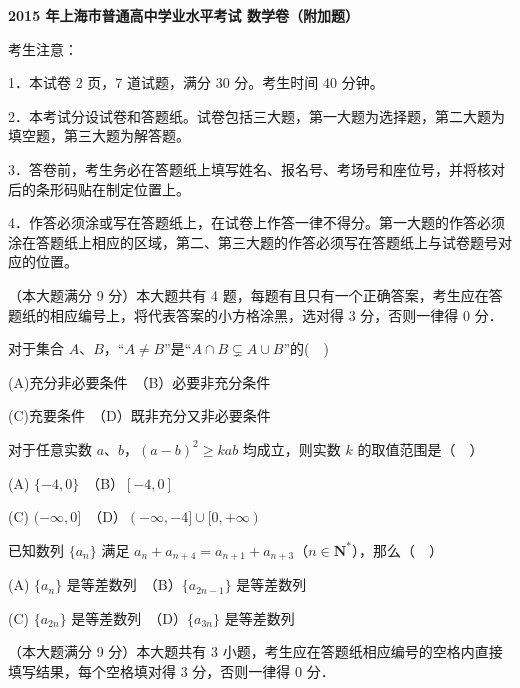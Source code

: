 \textbf{2015 年上海市普通高中学业水平考试 数学卷（附加题）}

考生注意：

1．本试卷 2 页，7 道试题，满分 30 分。考生时间 40 分钟。

2．本考试分设试卷和答题纸。试卷包括三大题，第一大题为选择题，第二大题为填空题，第三大题为解答题。

3．答卷前，考生务必在答题纸上填写姓名、报名号、考场号和座位号，并将核对后的条形码贴在制定位置上。

4．作答必须涂或写在答题纸上，在试卷上作答一律不得分。第一大题的作答必须涂在答题纸上相应的区域，第二、第三大题的作答必须写在答题纸上与试卷题号对应的位置。


（本大题满分 9 分）本大题共有 4 题，每题有且只有一个正确答案，考生应在答题纸的相应编号上，将代表答案的小方格涂黑，选对得 3 分，否则一律得 0 分．

\begin{question}
对于集合 \(A\)、\(B\)，“\(A\neq B\)”是“\(A\cap B\subsetneq A\cup B\)”的(　)

(A)充分非必要条件　（B）必要非充分条件

(C)充要条件　（D）既非充分又非必要条件

\end{question}
\begin{question}
对于任意实数 \(a\)、\(b\)，\((a-b)^{2}\geqslant kab\) 均成立，则实数 \(k\) 的取值范围是（　）

(A) \(\{-4,0\}\)　（B）\([-4,0]\)

(C) \((-\infty,0]\)　（D）\((-\infty,-4]\cup[0,+\infty)\)

\end{question}
\begin{question}
已知数列 \(\{a_{n}\}\) 满足 \(a_{n}+a_{n+4}=a_{n+1}+a_{n+3}\)（\(n\in\mathbf{N}^{*}\)），那么（　）

(A) \(\{a_{n}\}\) 是等差数列　（B）\(\{a_{2n-1}\}\) 是等差数列

(C) \(\{a_{2n}\}\) 是等差数列　（D）\(\{a_{3n}\}\) 是等差数列

\end{question}

（本大题满分 9 分）本大题共有 3 小题，考生应在答题纸相应编号的空格内直接填写结果，每个空格填对得 3 分，否则一律得 0 分．

